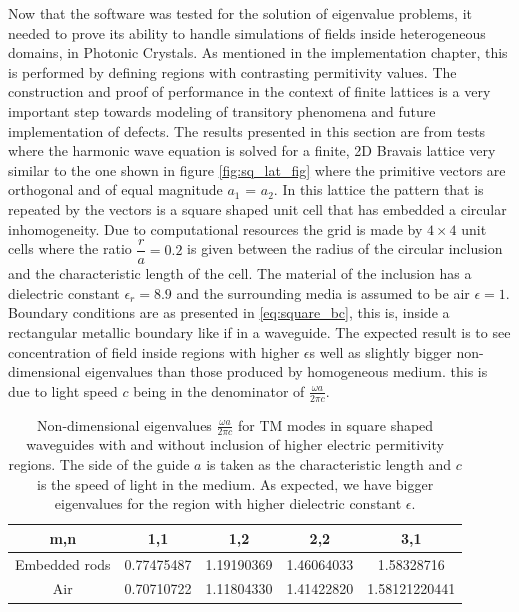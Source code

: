Now that the software was tested for the solution of eigenvalue problems, it needed to prove its ability to handle simulations of fields inside heterogeneous domains,  in Photonic Crystals. As mentioned in the implementation chapter, this is performed by defining regions with contrasting permitivity values. The construction and proof of performance in the context of finite lattices is a very important step towards modeling of transitory phenomena and future implementation of defects. 
The results presented in this section are from tests where the harmonic wave equation is solved for a finite, 2D Bravais lattice very similar to the one shown in figure \ref{fig:sq_lat_fig} where the primitive vectors are orthogonal and of equal magnitude $a_1$ = $a_2$. In this lattice the pattern that is repeated by the vectors is a square shaped unit cell that has embedded a circular inhomogeneity. 
Due to computational resources the grid is made by $4\times 4$ unit cells where the ratio $\dfrac{r}{a}=0.2$ is given between the radius of the circular inclusion and the characteristic length of the cell. The material of the inclusion has a dielectric constant $\epsilon_r = 8.9$ and the surrounding media is assumed to be air $\epsilon =1$. Boundary conditions are as presented in  \ref{eq:square_bc}, this is, inside a rectangular metallic boundary like if in a wave\remove[SEC]{-}guide. The expected result is to see concentration of field inside regions with higher $\epsilon$s well as slightly bigger non-dimensional eigenvalues than those produced by homogeneous medium. this is due to light speed $c$ being in the denominator of $\frac{\omega
a}{2\pi c}$. 
\begin{table}

\begin{center}
\begin{tabular}{|c|c|c|c|c|}
\hline 
m,n & 1,1 & 1,2 & 2,2 & 3,1 \\ 
\hline 
Embedded rods & 0.77475487 & 1.19190369 & 1.46064033 & 1.58328716 \\ 
\hline 
Air  & 0.70710722 &  1.11804330  &  1.41422820 & 1.58121220441 \\
\hline 
\end{tabular}
\caption{Non-dimensional eigenvalues $\frac{\omega a}{2\pi c}$ for TM modes in  square shaped waveguides with and without inclusion of higher electric permitivity regions. The side of the guide $a$ is taken as the characteristic length and $c$ is the speed of light in the medium. As expected, we have bigger eigenvalues for the region with higher dielectric constant $\epsilon$.}
\label{tab:fin_lat_comparison}
\end{center}
\end{table}

